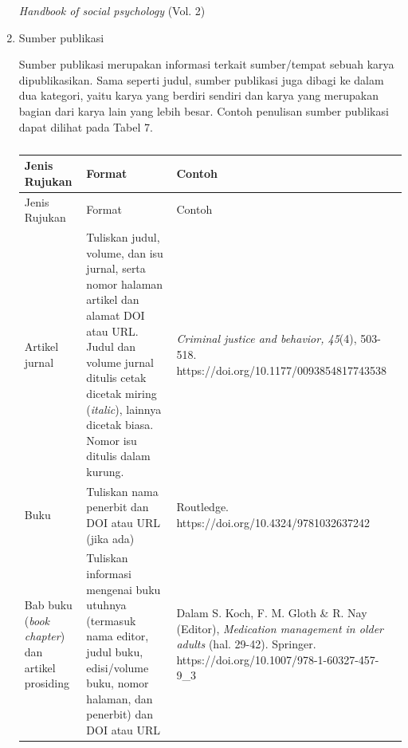 \documentclass[
  indonesian,
  letterpaper,
]{scrbook}
\begin{document}
\begin{enumerate}
\begin{longtable}[]
  \emph{Handbook of social psychology} (Vol. 2) \\
  \end{longtable}
\item
  Sumber publikasi

  Sumber publikasi merupakan informasi terkait sumber/tempat sebuah
  karya dipublikasikan. Sama seperti judul, sumber publikasi juga dibagi
  ke dalam dua kategori, yaitu karya yang berdiri sendiri dan karya yang
  merupakan bagian dari karya lain yang lebih besar. Contoh penulisan
  sumber publikasi dapat dilihat pada Tabel 7.

  \begin{longtable}[]{@{}
    >{\raggedright\arraybackslash}p{}
    >{\raggedright\arraybackslash}p{}
    >{\raggedright\arraybackslash}p{}@{}}
  \caption{}\label{tbl-formatsumberdafpus}\tabularnewline
  \toprule\noalign{}
  \begin{minipage}[b]{\linewidth}\raggedright
  Jenis Rujukan
  \end{minipage} & \begin{minipage}[b]{\linewidth}\raggedright
  Format
  \end{minipage} & \begin{minipage}[b]{\linewidth}\raggedright
  Contoh
  \end{minipage} \\
  \midrule\noalign{}
  \endfirsthead
  \toprule\noalign{}
  \begin{minipage}[b]{\linewidth}\raggedright
  Jenis Rujukan
  \end{minipage} & \begin{minipage}[b]{\linewidth}\raggedright
  Format
  \end{minipage} & \begin{minipage}[b]{\linewidth}\raggedright
  Contoh
  \end{minipage} \\
  \midrule\noalign{}
  \endhead
  \bottomrule\noalign{}
  \endlastfoot
  Artikel jurnal & Tuliskan judul, volume, dan isu jurnal, serta nomor
  halaman artikel dan alamat DOI atau URL. Judul dan volume jurnal
  ditulis cetak dicetak miring (\emph{italic}), lainnya dicetak biasa.
  Nomor isu ditulis dalam kurung. & \emph{Criminal justice and behavior,
  45}(4), 503-518. https://doi.org/10.1177/0093854817743538 \\
  Buku & Tuliskan nama penerbit dan DOI atau URL (jika ada) & Routledge.
  https://doi.org/10.4324/9781032637242 \\
  Bab buku (\emph{book chapter}) dan artikel prosiding & Tuliskan
  informasi mengenai buku utuhnya (termasuk nama editor, judul buku,
  edisi/volume buku, nomor halaman, dan penerbit) dan DOI atau URL &
  Dalam S. Koch, F. M. Gloth \& R. Nay (Editor), \emph{Medication
  management in older adults} (hal. 29-42). Springer.
  https://doi.org/10.1007/978-1-60327-457-9\_3


\end{longtable}
\end{enumerate}
\end{document}
